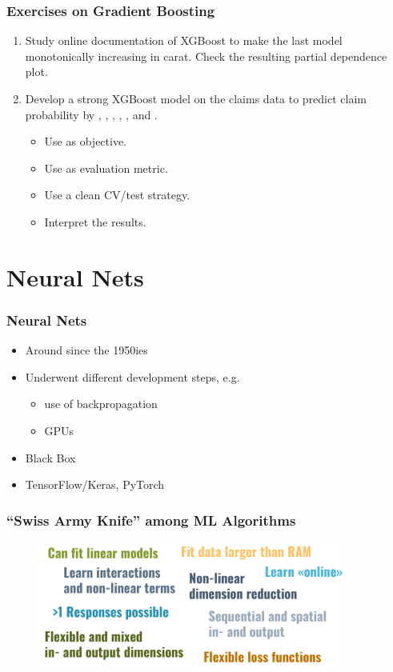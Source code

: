 \documentclass[
    utf8,
    aspectratio=169
]{beamer}  %
\begin{document}
\begin{frame}
	\frametitle{Exercises on Gradient Boosting}
	\begin{enumerate}
		\item Study online documentation of XGBoost to make the last model monotonically increasing in carat. Check the resulting partial dependence plot.
		
		\vfill
		
		\item Develop a strong XGBoost model on the claims data to predict claim probability by , , , , , and .
		\begin{itemize}
			\item Use \alert{} as objective.
			\item Use \alert{} as evaluation metric.
			\item Use a clean CV/test strategy.
			\item Interpret the results.
		\end{itemize}
	\end{enumerate}
\end{frame}

\section{Neural Nets}

\begin{frame}
	\frametitle{Neural Nets}
	\begin{itemize}
		\item Around since the 1950ies
		\item Underwent different development steps, e.g.
		\begin{itemize}
			\item use of backpropagation
			\item GPUs
		\end{itemize}
		\item Black Box
		\item TensorFlow/Keras, PyTorch
	\end{itemize}
\end{frame}

\begin{frame}
	\frametitle{``Swiss Army Knife'' among ML Algorithms}
	\begin{figure}
		\includegraphics[width=0.9\textwidth]{pics/nn_knife.png}
	\end{figure}
\end{frame}
\end{document}
